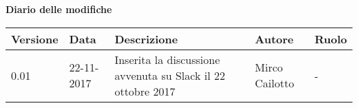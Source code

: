 \documentclass[main.tex]{subfiles}
\begin{document}
\huge \bfseries Diario delle modifiche\\
\begin{table}[htbp]
	\centering
	\renewcommand\arraystretch{1.2}

	\begin{tabularx}{\textwidth}{p{2cm}|p{2cm}|p{3cm}|p{2cm}|p{3cm}}
		\hline
		\textbf{Versione} & \textbf{Data} & \textbf{Descrizione} & \textbf{Autore} & \textbf{Ruolo}\\
		\hline
		0.01 & 22-11-2017 & Inserita la discussione avvenuta su Slack il 22 ottobre 2017& Mirco Cailotto & -\\
	
	\end{tabularx}

\end{table}
\end{document}
